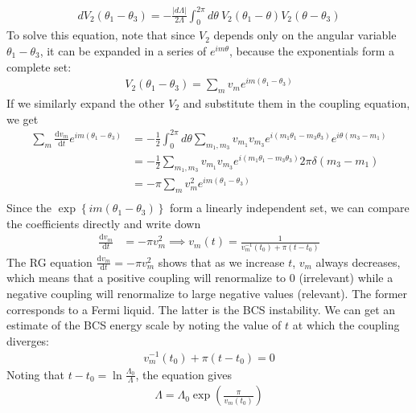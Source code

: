 \documentclass{article}
\begin{document}
\begin{equation}\begin{aligned}
	dV_2(\theta_1 - \theta_3) = -\frac{|d\Lambda|}{2\Lambda}  \int_0^{2\pi} d\theta~ V_2(\theta_1 - \theta) V_2(\theta - \theta_3)
\end{aligned}\end{equation}
To solve this equation, note that since \(V_2\) depends only on the angular variable \(\theta_1 - \theta_3\), it can be expanded in a series of \(e^{im\theta}\), because the exponentials form a complete set:
\begin{equation}\begin{aligned}
	V_2(\theta_1 - \theta_3) = \sum_m v_m e^{im\left(\theta_1 - \theta_3\right)}
\end{aligned}\end{equation}
If we similarly expand the other \(V_2\) and substitute them in the coupling equation, we get
\begin{equation}\begin{aligned}
	\sum_m \frac{\mathrm{d}v_m}{\mathrm{d}t} e^{im\left(\theta_1 - \theta_3\right)} &= -\frac{1}{2}\int_0^{2\pi} d\theta \sum_{m_1,m_3}v_{m_1}v_{m_3}e^{i\left(m_1\theta_1 - m_3\theta_3\right)}e^{i\theta\left(m_3 - m_1\right)}\\
											   &=-\frac{1}{2}\sum_{m_1,m_3}v_{m_1}v_{m_3}e^{i\left(m_1\theta_1 - m_3\theta_3\right)}2\pi \delta\left(m_3 - m_1\right)\\
											   &=-\pi\sum_{m}v_m^2e^{im\left(\theta_1 - \theta_3\right)}\\
\end{aligned}\end{equation}
Since the \(\exp\left\{im\left(\theta_1 - \theta_3\right)\right\}\) form a linearly independent set, we can compare the coefficients directly and write down
\begin{equation}\begin{aligned}
\label{rgeq}
\frac{\mathrm{d}v_m}{\mathrm{d}t} &= -\pi v^2_{m} \implies v_m(t) = \frac{1}{v_m^{-1}(t_0) + \pi \left( t - t_0 \right) }
\end{aligned}\end{equation}
The RG equation \(\frac{\mathrm{d}v_m}{\mathrm{d}t} = -\pi v^2_{m}\) shows that as we increase \(t\), \(v_m\) always decreases, which means that a positive coupling will renormalize to 0 (irrelevant) while a negative coupling will renormalize to large negative values (relevant). The former corresponds to a Fermi liquid. The latter is the BCS instability. We can get an estimate of the BCS energy scale by noting the value of \(t\) at which the coupling diverges:
\begin{equation}\begin{aligned}
	v_m^{-1}(t_0) + \pi \left( t - t_0 \right)  = 0
\end{aligned}\end{equation}
Noting that \(t - t_0 = \ln \frac{\Lambda_0}{\Lambda}\), the equation gives
\begin{equation}\begin{aligned}
	\Lambda = \Lambda_0 \exp\left(\frac{\pi}{v_m(t_0)}\right)
\end{aligned}\end{equation}
\end{document}
